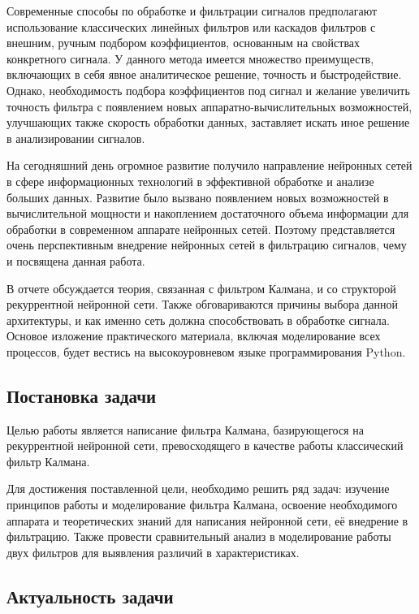 \documentclass[a4paper,11pt]{article} %
\begin{document}
Современные способы по обработке и фильтрации сигналов предполагают использование  классических линейных фильтров или каскадов фильтров с внешним,  ручным подбором коэффициентов, основанным на свойствах конкретного сигнала. У данного метода имеется множество преимуществ, включающих в себя явное аналитическое решение, точность и быстродействие. Однако, необходимость подбора коэффициентов под сигнал и желание увеличить точность фильтра с появлением новых аппаратно-вычислительных возможностей, улучшающих также скорость обработки данных, заставляет искать иное решение в анализировании сигналов. 

На сегодняшний день огромное развитие получило направление нейронных сетей в сфере информационных технологий в эффективной обработке и анализе больших данных. Развитие было вызвано появлением новых возможностей в вычислительной мощности и накоплением достаточного объема информации для обработки в современном аппарате нейронных сетей. Поэтому представляется очень перспективным внедрение нейронных сетей в фильтрацию сигналов, чему и посвящена данная работа. 

В отчете обсуждается теория, связанная с фильтром Калмана, и со структорой рекуррентной нейронной сети. Также обговариваются причины выбора данной архитектуры, и как именно сеть должна способствовать в обработке сигнала. Основое изложение практического материала, включая моделирование всех процессов, будет вестись на высокоуровневом языке программирования Python.

\pagebreak
\subsection{Постановка задачи}

Целью работы является написание фильтра Калмана,  базирующегося на рекуррентной нейронной сети,  превосходящего в качестве работы классический фильтр Калмана.

Для достижения поставленной цели,  необходимо решить ряд задач: изучение принципов работы и моделирование фильтра Калмана,  освоение необходимого аппарата и теоретических знаний для написания нейронной сети,  её внедрение в фильтрацию.  Также провести  сравнительный анализ в моделирование работы двух фильтров для выявления различий в характеристиках.

\subsection{Актуальность задачи}
\end{document}
